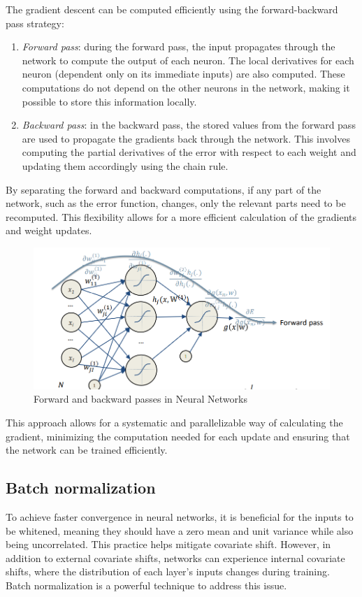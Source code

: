 The gradient descent can be computed efficiently using the forward-backward pass strategy:
\begin{enumerate}
    \item \textit{Forward pass}: during the forward pass, the input propagates through the network to compute the output of each neuron. 
        The local derivatives for each neuron (dependent only on its immediate inputs) are also computed. 
        These computations do not depend on the other neurons in the network, making it possible to store this information locally.
    \item \textit{Backward pass}: in the backward pass, the stored values from the forward pass are used to propagate the gradients back through the network.
        This involves computing the partial derivatives of the error with respect to each weight and updating them accordingly using the chain rule.
\end{enumerate}
By separating the forward and backward computations, if any part of the network, such as the error function, changes, only the relevant parts need to be recomputed. 
This flexibility allows for a more efficient calculation of the gradients and weight updates.
\begin{figure}[H]
    \centering
    \includegraphics[width=0.75\linewidth]{images/bacfor.png}
    \caption{Forward and backward passes in Neural Networks}
\end{figure}
This approach allows for a systematic and parallelizable way of calculating the gradient, minimizing the computation needed for each update and ensuring that the network can be trained efficiently.

\subsection{Batch normalization}
To achieve faster convergence in neural networks, it is beneficial for the inputs to be whitened, meaning they should have a zero mean and unit variance while also being uncorrelated. 
This practice helps mitigate covariate shift. 
However, in addition to external covariate shifts, networks can experience internal covariate shifts, where the distribution of each layer's inputs changes during training.
Batch normalization is a powerful technique to address this issue.

